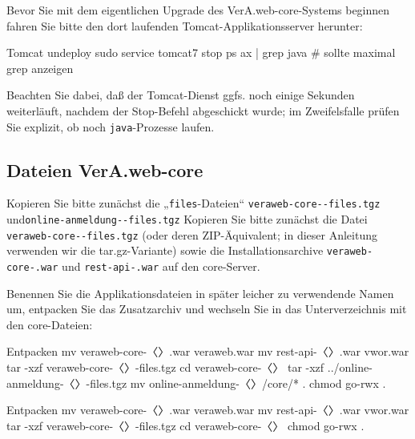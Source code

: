 \begin{minipage}{\textwidth}
Bevor Sie mit dem eigentlichen Upgrade des VerA.web-core-Systems beginnen
fahren Sie bitte den dort laufenden Tomcat-Applikationsserver herunter:

\begin{lstdump}{Tomcat undeploy}
sudo service tomcat7 stop
ps ax | grep java # sollte maximal grep anzeigen
\end{lstdump}

Beachten Sie dabei, daß der Tomcat-Dienst ggfs. noch einige Sekunden
weiterläuft, nachdem der Stop-Befehl abgeschickt wurde; im Zweifelsfalle
prüfen Sie explizit, ob noch \texttt{java}-Prozesse laufen.
\end{minipage}

\subsection{Dateien VerA.web-core}\label{subsec:upgrade-core-files}

\ifoa
Kopieren Sie bitte zunächst die „\texttt{files}-Dateien“
\texttt{veraweb-core-\vwiaverssw{}-files.tgz} und\linebreak[1]
\texttt{online-anmeldung-\vwiaverssw{}-files.tgz}
\else%
Kopieren Sie bitte zunächst die Datei
\texttt{veraweb-core-\vwiaverssw{}-files.tgz}
\fi%
(oder deren ZIP-Äquivalent; in dieser Anleitung verwenden
wir die tar.gz-Variante) sowie die Installationsarchive
\texttt{veraweb-core-\vwiaverssw{}.war}
und \texttt{rest-api-\vwiaverssw{}.war} auf den core-Server.

\begin{minipage}{\textwidth}
Benennen Sie die Applikationsdateien in später leicher zu
verwendende Namen um, entpacken Sie das Zusatzarchiv und
wechseln Sie in das Unterverzeichnis mit den core-Dateien:

\ifoa
\begin{lstdump}{Entpacken}
mv veraweb-core-〈\lstdumpesc{\vwiaverssw}〉.war veraweb.war
mv rest-api-〈\lstdumpesc{\vwiaverssw}〉.war vwor.war
tar -xzf veraweb-core-〈\lstdumpesc{\vwiaverssw}〉-files.tgz
cd veraweb-core-〈\lstdumpesc{\vwiaverssw}〉
tar -xzf ../online-anmeldung-〈\lstdumpesc{\vwiaverssw}〉-files.tgz
mv online-anmeldung-〈\lstdumpesc{\vwiaverssw}〉/core/* .
chmod go-rwx .
\end{lstdump}
\else%
\begin{lstdump}{Entpacken}
mv veraweb-core-〈\lstdumpesc{\vwiaverssw}〉.war veraweb.war
mv rest-api-〈\lstdumpesc{\vwiaverssw}〉.war vwor.war
tar -xzf veraweb-core-〈\lstdumpesc{\vwiaverssw}〉-files.tgz
cd veraweb-core-〈\lstdumpesc{\vwiaverssw}〉
chmod go-rwx .
\end{lstdump}
\fi%
\end{minipage}

